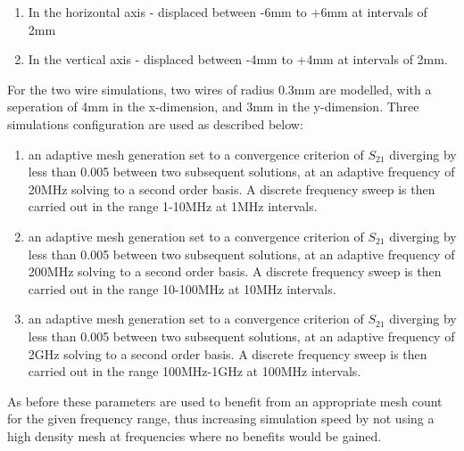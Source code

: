 \begin{enumerate}
\item{In the horizontal axis -  displaced between -6mm to +6mm at intervals of 2mm}
\item{In the vertical axis - displaced between -4mm to +4mm at intervals of 2mm.}
\end{enumerate}

For the two wire simulations, two wires of radius 0.3mm are modelled, with a seperation of 4mm in the x-dimension, and 3mm in the y-dimension. Three simulations configuration are used as described below:

\begin{enumerate}
\item{an adaptive mesh generation set to a convergence criterion of $S_{21}$ diverging by less than 0.005 between two subsequent solutions, at an adaptive frequency of 20MHz solving to a second order basis. A discrete frequency sweep is then carried out in the range 1-10MHz at 1MHz intervals.}
\item{an adaptive mesh generation set to a convergence criterion of $S_{21}$ diverging by less than 0.005 between two subsequent solutions, at an adaptive frequency of 200MHz solving to a second order basis. A discrete frequency sweep is then carried out in the range 10-100MHz at 10MHz intervals.}
\item{an adaptive mesh generation set to a convergence criterion of $S_{21}$ diverging by less than 0.005 between two subsequent solutions, at an adaptive frequency of 2GHz solving to a second order basis. A discrete frequency sweep is then carried out in the range 100MHz-1GHz at 100MHz intervals.}
\end{enumerate}

As before these parameters are used to benefit from an appropriate mesh count for the given frequency range, thus increasing simulation speed by not using a high density mesh at frequencies where no benefits would be gained.

